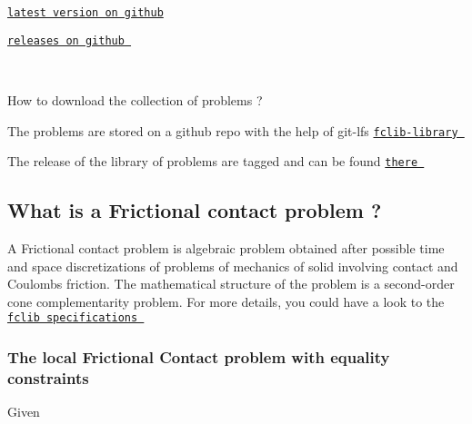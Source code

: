 \begin{DoxyItemize}
\item \href{https://github.com/FrictionalContactLibrary/fclib}{\tt latest version on github} 
\item \href{https://github.com/FrictionalContactLibrary/fclib/releases}{\tt releases on github } 
\end{DoxyItemize}

~\newline
 

How to download the collection of problems ? 
\begin{DoxyItemize}
\item The problems are stored on a github repo with the help of git-\/lfs \href{https://github.com/FrictionalContactLibrary/fclib-library}{\tt fclib-\/library }  
\item The release of the library of problems are tagged and can be found \href{https://github.com/FrictionalContactLibrary/fclib-library/releases}{\tt there }  ~\newline
 ~\newline
 






\end{DoxyItemize}\hypertarget{index_Wahtis}{}\subsection{What is a Frictional contact problem ?}\label{index_Wahtis}
A Frictional contact problem is algebraic problem obtained after possible time and space discretizations of problems of mechanics of solid involving contact and Coulomb\textquotesingle{}s friction. The mathematical structure of the problem is a second-\/order cone complementarity problem. For more details, you could have a look to the \href{doc/FCLib.pdf}{\tt fclib specifications }\hypertarget{index_Localfclib}{}\subsubsection{The local Frictional Contact problem with equality constraints}\label{index_Localfclib}
Given 
